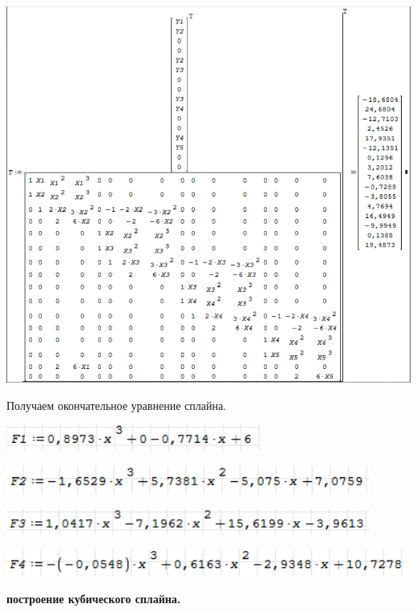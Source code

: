 \documentclass[russian,utf8,nocolumxxxi,nocolumnxxxii]{eskdtext}
\begin{document}
\begin{center}\includegraphics[scale=0.6]{6}\end{center}

\par
\normalsize
Получаем окончательное уравнение сплайна.
\begin{center}\includegraphics[scale=1]{7}\end{center}
\begin{center}\includegraphics[scale=1]{8}\end{center}
\begin{center}\includegraphics[scale=1]{9}\end{center}
\begin{center}\includegraphics[scale=1]{10}\end{center}
\newpage
\begin{center}{\bf построение кубического сплайна.}\\\end{center}
\end{document}
